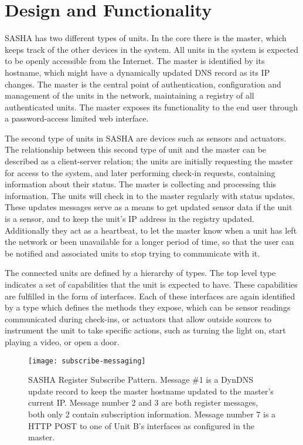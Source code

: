 \section{Design and Functionality}

SASHA has two different types of units. In the core there is the master, which keeps track of the other devices in the system. All units in the system is expected to be openly accessible from the Internet. The master is identified by its hostname, which might have a dynamically updated DNS record as its IP changes. The master is the central point of authentication, configuration and management of the units in the network, maintaining a registry of all authenticated units. The master exposes its functionality to the end user through a password-access limited web interface.

The second type of units in SASHA are devices such as sensors and actuators. The relationship between this second type of unit and the master can be described as a client-server relation; the units are initially requesting the master for access to the system, and later performing check-in requests, containing information about their status. The master is collecting and processing this information. The units will check in to the master regularly with status updates. These updates messages serve as a means to get updated sensor data if the unit is a sensor, and to keep the unit's IP address in the registry updated. Additionally they act as a heartbeat, to let the master know when a unit has left the network or been unavailable for a longer period of time, so that the user can be notified and associated units to stop trying to communicate with it.

The connected units are defined by a hierarchy of types. The top level type indicates a set of capabilities that the unit is expected to have. These capabilities are fulfilled in the form of interfaces. Each of these interfaces are again identified by a type which defines the methods they expose, which can be sensor readings communicated during check-ins, or actuators that allow outside sources to instrument the unit to take specific actions, such as turning the light on, start playing a video, or open a door.

\begin{figure}[ht!]
    \centering
    \texttt{[image: subscribe-messaging]}\label{fig:subscribe-messaging}
    \caption{SASHA Register Subscribe Pattern. Message \#1 is a DynDNS update record to keep the master hostname updated to the master's current IP. Message number 2 and 3 are both register messages, both only 2 contain subscription information. Message number 7 is a HTTP POST to one of Unit B's interfaces as configured in the master.}
\end{figure}

